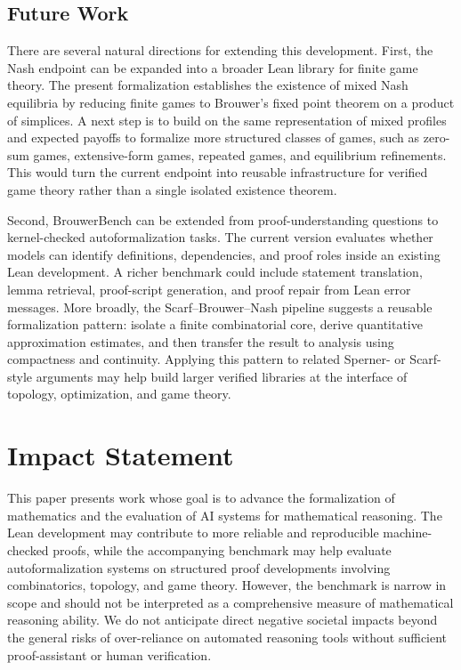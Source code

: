 \documentclass{article}
\theoremstyle{definition}
\begin{document}
\subsection{Future Work}

There are several natural directions for extending this development. First, the Nash endpoint can be expanded into a broader Lean library for finite game theory. The present formalization establishes the existence of mixed Nash equilibria by reducing finite games to Brouwer's fixed point theorem on a product of simplices. A next step is to build on the same representation of mixed profiles and expected payoffs to formalize more structured classes of games, such as zero-sum games, extensive-form games, repeated games, and equilibrium refinements. This would turn the current endpoint into reusable infrastructure for verified game theory rather than a single isolated existence theorem.

Second, BrouwerBench can be extended from proof-understanding questions to kernel-checked autoformalization tasks. The current version evaluates whether models can identify definitions, dependencies, and proof roles inside an existing Lean development. A richer benchmark could include statement translation, lemma retrieval, proof-script generation, and proof repair from Lean error messages. More broadly, the Scarf--Brouwer--Nash pipeline suggests a reusable formalization pattern: isolate a finite combinatorial core, derive quantitative approximation estimates, and then transfer the result to analysis using compactness and continuity. Applying this pattern to related Sperner- or Scarf-style arguments may help build larger verified libraries at the interface of topology, optimization, and game theory.






\section*{Impact Statement}

This paper presents work whose goal is to advance the formalization of mathematics and the evaluation of AI systems for mathematical reasoning. The Lean development may contribute to more reliable and reproducible machine-checked proofs, while the accompanying benchmark may help evaluate autoformalization systems on structured proof developments involving combinatorics, topology, and game theory. However, the benchmark is narrow in scope and should not be interpreted as a comprehensive measure of mathematical reasoning ability. We do not anticipate direct negative societal impacts beyond the general risks of over-reliance on automated reasoning tools without sufficient proof-assistant or human verification.
\end{document}
